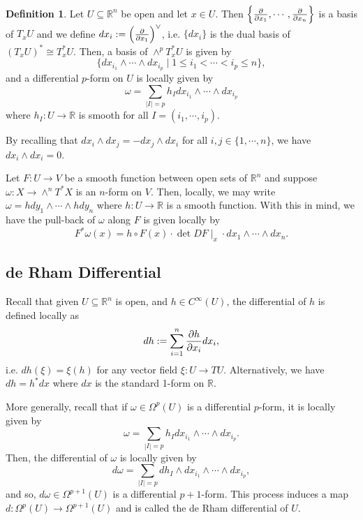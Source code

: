 \documentclass[]{article}
\theoremstyle{definition}
\theoremstyle{definition}
\newtheorem{definition}{Definition}[section]
\begin{document}
\begin{definition}
  Let \(U \subseteq \mathbb{R}^n\) be open and let \(x \in U\). Then 
  \(\left\{\pdv{x_1}, \cdots, \pdv{x_n}\right\}\) is a basis of 
  \(T_x U\) and we define \(dx_i := \left(\pdv{x_1}\right)^\vee\), i.e. 
  \(\{dx_i\}\) is the dual basis of \((T_x U)^* \cong T^*_x U\). Then, 
  a basis of \(\wedge^p T^*_x U\) is given by 
  \[\{dx_{i_1} \wedge \cdots \wedge dx_{i_p} \mid 1 \le i_1 < \cdots < i_p \le n\},\]
  and a differential \(p\)-form on \(U\) is locally given by 
  \[\omega = \sum_{|I| = p} h_I dx_{i_1} \wedge \cdots \wedge dx_{i_p}\]
  where \(h_I : U \to \mathbb{R}\) is smooth for all \(I = (i_1, \cdots, i_p)\).
\end{definition}

By recalling that \(dx_i \wedge dx_j = - dx_j \wedge dx_i\) for all 
\(i, j \in \{1, \cdots, n\}\), we have \(dx_i \wedge dx_i = 0\).

Let \(F : U \to V\) be a smooth function between open sets of \(\mathbb{R}^n\) 
and suppose \(\omega : X \to \wedge^n T^* X\) is an \(n\)-form on \(V\). Then, 
locally, we may write \(\omega = hdy_1 \wedge \cdots \wedge hdy_n\) where 
\(h : U \to \mathbb{R}\) is a smooth function. With this in mind, 
we have the pull-back of \(\omega\) along \(F\) is given locally by 
\[F^* \omega(x) = h \circ F(x) \cdot \det DF\mid_x \cdot dx_1 \wedge \cdots \wedge dx_n.\]

\subsection{de Rham Differential}

Recall that given \(U \subseteq \mathbb{R}^n\) is open, and \(h \in C^\infty(U)\), 
the differential of \(h\) is defined locally as 
\[dh := \sum_{i = 1}^n \pdv{h}{x_i} dx_i,\]
i.e. \(dh(\xi) = \xi(h)\) for any vector field \(\xi : U \to TU\).
Alternatively, we have \(dh = h^* dx\) where \(dx\) is the 
standard 1-form on \(\mathbb{R}\).

More generally, recall that if \(\omega \in \Omega^p(U)\) is a 
differential \(p\)-form, it is locally given by 
\[\omega = \sum_{|I| = p} h_I dx_{i_1} \wedge \cdots \wedge dx_{i_p}.\]
Then, the differential of \(\omega\) is locally given by 
\[d\omega = \sum_{|I| = p} dh_I \wedge dx_{i_1} \wedge \cdots \wedge dx_{i_p},\]
and so, \(d\omega \in \Omega^{p + 1}(U)\) is a differential \(p + 1\)-form.
This process induces a map \(d : \Omega^p(U) \to \Omega^{p + 1}(U)\) and 
is called the de Rham differential of \(U\).
\end{document}
